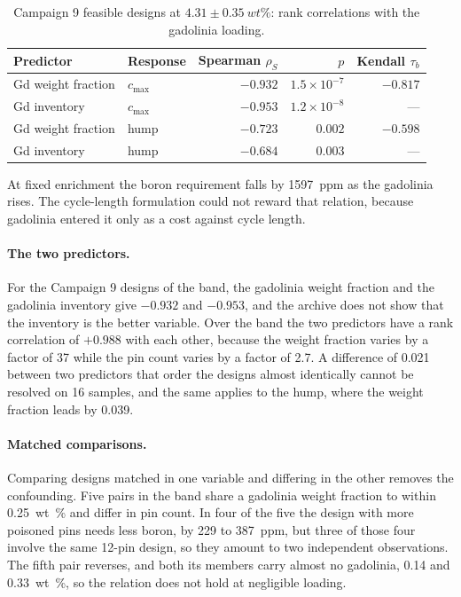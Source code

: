 \begin{table}[htbp]
  \centering
  \caption{Campaign 9 feasible designs at $4.31 \pm \SI{0.35}{wt\%}$: rank correlations with the gadolinia loading.}
  \label{tab:c9-gd-corr}
  \small
  \begin{tabular}{@{}llrrr@{}}
    \toprule
    Predictor & Response & Spearman $\rho_S$ & $p$ & Kendall $\tau_b$ \\
    \midrule
    Gd weight fraction & $c_\mathrm{max}$ & $-0.932$ & $1.5\times10^{-7}$ & $-0.817$ \\
    Gd inventory       & $c_\mathrm{max}$ & $-0.953$ & $1.2\times10^{-8}$ & --- \\
    Gd weight fraction & hump             & $-0.723$ & $0.002$ & $-0.598$ \\
    Gd inventory       & hump             & $-0.684$ & $0.003$ & --- \\
    \bottomrule
  \end{tabular}
\end{table}

At fixed enrichment the boron requirement falls by \SI{1597}{ppm} as the
gadolinia rises. The cycle-length formulation could not reward that
relation, because gadolinia entered it only as a cost against cycle length.

\paragraph{The two predictors.}
For the Campaign 9 designs of the band, the gadolinia weight fraction
and the gadolinia inventory give $-0.932$ and $-0.953$, and the
archive does not show that the inventory is the better variable. Over the
band the two predictors have a rank correlation of $+0.988$ with each other,
because the weight fraction varies by a factor of 37 while the pin count
varies by a factor of 2.7. A difference of 0.021 between two predictors
that order the designs almost identically cannot be resolved on 16 samples,
and the same applies to the hump, where the weight fraction leads by 0.039.

\paragraph{Matched comparisons.}
Comparing designs matched in one variable and differing in the other
removes the confounding. Five pairs in the band share a gadolinia weight
fraction to within \SI{0.25}{wt\%} and differ in pin count. In four of the
five the design with more poisoned pins needs less boron, by 229 to
\SI{387}{ppm}, but three of those four involve the same 12-pin design, so
they amount to two independent observations. The fifth pair reverses, and
both its members carry almost no gadolinia, 0.14 and \SI{0.33}{wt\%}, so the
relation does not hold at negligible loading.

